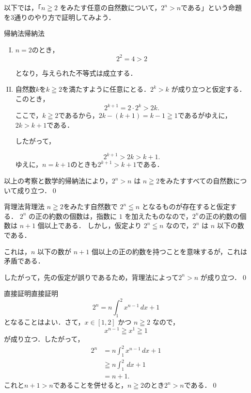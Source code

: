 \documentclass[a4paper,11pt]{ltjsarticle}
\renewcommand{\geq}{\geqq}
\begin{document}
以下では，「$n \geq 2$ をみたす任意の自然数について，$2^n > n$である」という命題を3通りのやり方で証明してみよう．

\begin{example}{帰納法}{帰納法}
  \begin{enumerate}[(I)]
    \item $n=2$のとき，
          \[
            2^2 = 4 > 2
          \]

          となり，与えられた不等式は成立する．
    \item 自然数$k$を$k \geqq 2$を満たすように任意にとる．$2^k > k$ が成り立つと仮定する．このとき，
          \[
            2^{k+1} = 2 \cdot 2^k > 2k.
          \]
          ここで，$k \geqq 2$であるから，$2k - (k + 1) = k - 1 \geq 1$であるがゆえに，$2k > k + 1$である．

          したがって，

          \[
            2^{k+1} > 2k > k + 1.
          \]
          ゆえに，$n=k+1$のときも$2^{k+1} > k + 1$である．
  \end{enumerate}

  以上の考察と数学的帰納法により，$2^n > n$ は $n \geq 2$をみたすすべての自然数について成り立つ．\qed
\end{example}

\begin{example}{背理法}{背理法}
  $n \geqq 2$をみたす自然数で $2^n \leqq n$ となるものが存在すると仮定する．
  $2^n$ の正の約数の個数は，指数に $1$ を加えたものなので，$2^n$の正の約数の個数は $n + 1$ 個以上である．
  しかし，仮定より $2^n \leqq n$ なので，$2^n$ は $n$ 以下の数である．

  これは，$n$ 以下の数が $n + 1$ 個以上の正の約数を持つことを意味するが，これは矛盾である．

  したがって，先の仮定が誤りであるため，背理法によって$2^n > n$ が成り立つ．\qed
\end{example}

\begin{example}{直接証明}{直接証明}
  \[
    2^n = n \int_{1}^{2} x^{n-1} \, dx + 1
  \]
  となることはよい．さて，$x \in [1, 2]$ かつ $n \geqq 2$ なので，
  \[
    x^{n-1} \geqq x^{1} \geqq 1
  \]
  が成り立つ．したがって，
  \begin{align*}
    2^n & = n \int_{1}^{2} x^{n-1} \, dx + 1 \\
        & \geqq  n \int_{1}^{2} \, dx +1     \\
        & = n+1.
  \end{align*}
  これと$n+1 >n$であることを併せると，$n \geqq 2$のとき$2^n > n$である．\qed
\end{example}
\newpage
\end{document}
